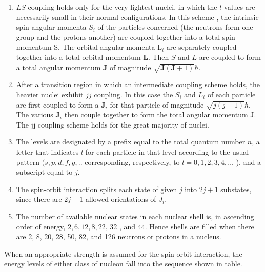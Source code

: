 	\begin{enumerate}
		\item  $L S$ coupling holds only for the very lightest nuclei, in which the $l$ values are necessarily small in their normal configurations. In this scheme , the intrinsic spin angular momenta $S_{i}$ of the particles concerned (the neutrons form one group and the protons another) are coupled together into a total spin momentum $\mathrm{S}$. The orbital angular momenta $\mathrm{L}_{i}$ are separately coupled together into a total orbital momentum $\mathbf{L}$. Then $S$ and $L$ are coupled to form a total angular momentum $\mathbf{J}$ of magnitude $\sqrt{\mathbf{J}(\mathbf{J}+1)} \hbar$.
		\item After a transition region in which an intermediate coupling scheme holds, the heavier nuclei exhibit $j j$ coupling. In this case the $S_{i}$ and $L_{i}$ of each particle are first coupled to form a $\mathbf{J}_{i}$ for that particle of magnitude $\sqrt{j(j+1)} \hbar$. The various $\mathbf{J}_{i}$ then couple together to form the total angular momentum $\mathrm{J}$. The $\mathrm{jj}$ coupling scheme holds for the great majority of nuclei.
		\item The levels are designated by a prefix equal to the total quantum number $n$, a letter that indicates $l$ for each particle in that level according to the usual pattern $(s, p, d, f, g, . .$ corresponding, respectively, to $l=0,1,2,3,4, \ldots$ ), and a subscript equal to $j$.
		\item The spin-orbit interaction splits each state of given $j$ into $2 j+1$ substates, since there are $2 j+1$ allowed orientations of $J_{i}$.
		\item The number of available nuclear states in each nuclear shell is, in ascending order of energy, $2,6,12,8,22$, 32 , and 44. Hence shells are filled when there are 2, 8, 20, 28, 50, 82, and 126 neutrons or protons in a nucleus.
	\end{enumerate}
When an appropriate strength is assumed for the spin-orbit interaction, the energy levels of either class of nucleon fall into the sequence shown in table.
